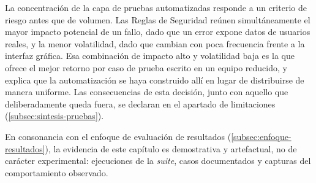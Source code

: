 La concentración de la capa de pruebas automatizadas responde a un criterio de riesgo antes que de volumen. Las Reglas de Seguridad reúnen simultáneamente el mayor impacto potencial de un fallo, dado que un error expone datos de usuarios reales, y la menor volatilidad, dado que cambian con poca frecuencia frente a la interfaz gráfica. Esa combinación de impacto alto y volatilidad baja es la que ofrece el mejor retorno por caso de prueba escrito en un equipo reducido, y explica que la automatización se haya construido allí en lugar de distribuirse de manera uniforme. Las consecuencias de esta decisión, junto con aquello que deliberadamente queda fuera, se declaran en el apartado de limitaciones (\autoref{subsec:sintesis-pruebas}).

En consonancia con el enfoque de evaluación de resultados (\autoref{subsec:enfoque-resultados}), la evidencia de este capítulo es demostrativa y artefactual, no de carácter experimental: ejecuciones de la \textit{suite}, casos documentados y capturas del comportamiento observado.
